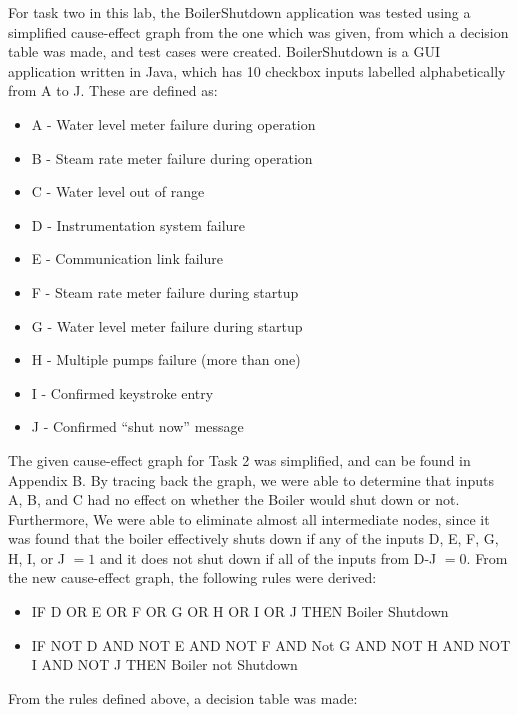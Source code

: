 For task two in this lab, the BoilerShutdown application was tested using
a simplified cause-effect graph from the one which was given, from which a
decision table was made, and test cases were created.
BoilerShutdown is a GUI application written in Java, which has 10 checkbox
inputs labelled alphabetically from A to J. These are defined as:
\begin{itemize}
	\item A - Water level meter failure during operation
	\item B - Steam rate meter failure during operation
	\item C - Water level out of range
	\item D - Instrumentation system failure
	\item E - Communication link failure
	\item F - Steam rate meter failure during startup
	\item G - Water level meter failure during startup
	\item H - Multiple pumps failure (more than one)
	\item I - Confirmed keystroke entry
	\item J - Confirmed ``shut now'' message
\end{itemize}

The given cause-effect graph for Task 2 was simplified, and can be found in
Appendix B. By tracing back the graph, we were able to determine that inputs
A, B, and C had no effect on whether the Boiler would shut down or not.
Furthermore, We were able to eliminate almost all intermediate nodes, since it
was found that the boiler effectively shuts down if any of the inputs D, E, F,
G, H, I, or J $=1$ and it does not shut down if all of the inputs from D-J
$=0$. From the new cause-effect graph, the following rules were derived:
\begin{itemize}
	\item IF D OR E OR F OR G OR H OR I OR J THEN Boiler Shutdown
	\item IF NOT D AND NOT E AND NOT F AND Not G AND NOT H AND NOT I AND
	      NOT J THEN Boiler not Shutdown
\end{itemize}

From the rules defined above, a decision table was made:
\vspace{20pt}

